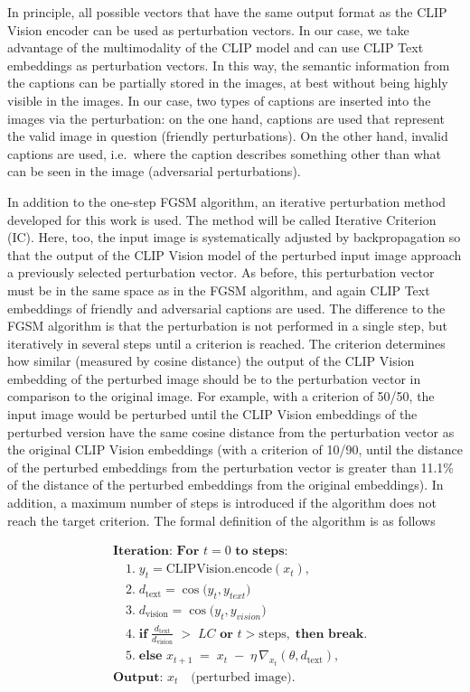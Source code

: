 In principle, all possible vectors that have the same output format as the CLIP Vision encoder can be used as perturbation vectors. In our case, we take advantage of the multimodality of the CLIP model and can use CLIP Text embeddings as perturbation vectors. In this way, the semantic information from the captions can be partially stored in the images, at best without being highly visible in the images. In our case, two types of captions are inserted into the images via the perturbation: on the one hand, captions are used that represent the valid image in question (friendly perturbations). On the other hand, invalid captions are used, i.e.\ where the caption describes something other than what can be seen in the image (adversarial perturbations). 

In addition to the one-step FGSM algorithm, an iterative perturbation method developed for this work is used. The method will be called Iterative Criterion (IC). Here, too, the input image is systematically adjusted by backpropagation so that the output of the CLIP Vision model of the perturbed input image approach a previously selected perturbation vector. As before, this perturbation vector must be in the same space as in the FGSM algorithm, and again CLIP Text embeddings of friendly and adversarial captions are used. The difference to the FGSM algorithm is that the perturbation is not performed in a single step, but iteratively in several steps until a criterion is reached. The criterion determines how similar (measured by cosine distance) the output of the CLIP Vision embedding of the perturbed image should be to the perturbation vector in comparison to the original image. For example, with a criterion of 50/50, the input image would be perturbed until the CLIP Vision embeddings of the perturbed version have the same cosine distance from the perturbation vector as the original CLIP Vision embeddings (with a criterion of 10/90, until the distance of the perturbed embeddings from the perturbation vector is greater than 11.1\% of the distance of the perturbed embeddings from the original embeddings). In addition, a maximum number of steps is introduced if the algorithm does not reach the target criterion. The formal definition of the algorithm is as follows 

\[
\begin{aligned}
& \textbf{Iteration: For } t = 0 \textbf{ to steps:}\\
& \quad 1.\; y_t = \mathrm{CLIP Vision.encode}(x_t), \\[4pt]
& \quad 2.\; d_{\text{text}} = \cos \bigl(y_t, y_{text} \bigr) \\[4pt]
& \quad 3.\; d_{\text{vision}} = \cos \bigl(y_t, y_{vision} \bigr) \\[4pt]
& \quad 4.\; \textbf{if} \;\frac{d_{\text{text}}}{d_{\text{vision}}} 
\;>\; LC \textbf{ or } t > \text{steps}, \;\textbf{then break}.\\[6pt]
& \quad 5.\; \textbf{else } x_{t+1} 
\;=\; x_t \;-\; \eta \,\nabla_{x_t} (\theta, d_{\text{text}}), \\[4pt]
%
& \textbf{Output: } x_t \quad \text{(perturbed image)}.
\end{aligned}
\]

